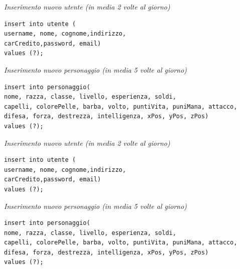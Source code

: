 \vspace{1cm}

\noindent\textit{Inserimento nuovo utente (in media 2 volte al giorno)}
\begin{verbatim}
insert into utente (
username, nome, cognome,indirizzo,
carCredito,password, email)
values (?);
\end{verbatim}
\vspace{0.5cm}

\noindent{}
\newline\newline

\noindent\textit{Inserimento nuovo personaggio (in media 5 volte al giorno)}
\begin{verbatim}insert into personaggio(
nome, razza, classe, livello, esperienza, soldi,
capelli, colorePelle, barba, volto, puntiVita, puniMana, attacco,
difesa, forza, destrezza, intelligenza, xPos, yPos, zPos)
values (?);

\end{verbatim}

\noindent\textit{Inserimento nuovo utente (in media 2 volte al giorno)}
\begin{verbatim}
insert into utente (
username, nome, cognome,indirizzo,
carCredito,password, email)
values (?);
\end{verbatim}
\vspace{0.5cm}

\noindent{}
\newline\newline

\noindent\textit{Inserimento nuovo personaggio (in media 5 volte al giorno)}
\begin{verbatim}insert into personaggio(
nome, razza, classe, livello, esperienza, soldi,
capelli, colorePelle, barba, volto, puntiVita, puniMana, attacco,
difesa, forza, destrezza, intelligenza, xPos, yPos, zPos)
values (?);

\end{verbatim}

